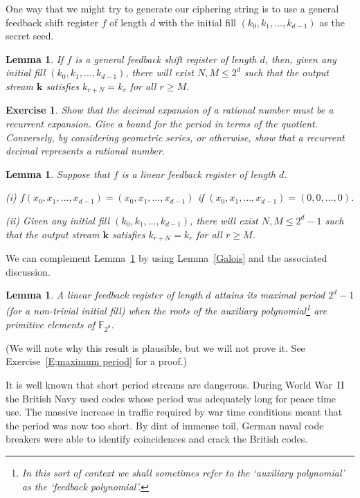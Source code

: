 \documentclass[12pt,a4paper]{article}
\theoremstyle{plain}
\newtheorem{lemma}[theorem]{Lemma}
\newtheorem{exercise}[theorem]{Exercise}
\theoremstyle{definition}
\begin{document}
One way that we might try to generate
our ciphering string is to use a general
feedback shift register $f$ of length $d$
with the initial fill $(k_{0},k_{1},\dots,k_{d-1})$
as the secret seed.
\begin{lemma} If $f$ is a general
feedback shift register of length
$d$, then, given any
initial fill $(k_{0},k_{1},\dots,k_{d-1})$,
there will exist $N,M\leq 2^{d}$
such that the output stream ${\mathbf k}$
satisfies $k_{r+N}=k_{r}$ for all $r\geq M$.
\end{lemma}
\begin{exercise}\label{E;rational} 
Show that the decimal expansion of
a rational number must be a recurrent expansion.
Give a bound for the period in terms of the quotient.
Conversely, by considering geometric series, or otherwise,
show that a recurrent decimal represents
a rational number.
\end{exercise}
\begin{lemma}\label{maximum linear}
Suppose that $f$ is a linear
feedback register of length $d$.

(i) $f(x_{0},x_{1},\dots,x_{d-1})=(x_{0},x_{1},\dots,x_{d-1})$
if $(x_{0},x_{1},\dots,x_{d-1})=(0,0,\dots,0)$.

(ii) Given any
initial fill $(k_{0},k_{1},\dots,k_{d-1})$,
there will exist $N,M\leq 2^{d}-1$
such that the output stream ${\mathbf k}$
satisfies $k_{r+N}=k_{r}$ for all $r\geq M$.
\end{lemma}
We can complement Lemma~\ref{maximum linear}
by using Lemma~\ref{Galois} and the associated
discussion.
\begin{lemma}\label{L;period bound}
A linear feedback register of length
$d$ attains its maximal period $2^{d}-1$
(for a non-trivial initial fill)
when the roots of the auxiliary polynomial\footnote{In
this sort of context we shall sometimes refer
to the `auxiliary polynomial' as the `feedback polynomial'.} 
are primitive elements of ${\mathbb F}_{2^{d}}$.
\end{lemma}
\noindent
(We will note why this result is plausible, but
we will not prove it. See Exercise~\ref{E;maximum period}
for a proof.)


It is well known that short period streams are dangerous.
During World War~II the British Navy used codes
whose period was adequately long for peace time use.
The massive increase in traffic required by
war time conditions meant that the period was
now too short. By dint of immense toil, German naval
code breakers were able to identify coincidences
and crack the British codes.
\end{document}
